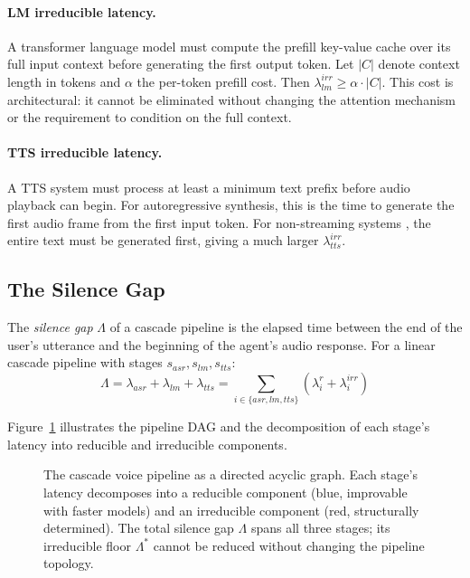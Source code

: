\paragraph{LM irreducible latency.}
A transformer language model \citep{vaswani2017attention} must compute the prefill
key-value cache over its full input context before generating the first output token.
Let $|C|$ denote context length in tokens and $\alpha$ the per-token prefill cost.
Then $\lambda_{lm}^{irr} \geq \alpha \cdot |C|$.
This cost is architectural: it cannot be eliminated without changing the attention
mechanism or the requirement to condition on the full context.

\paragraph{TTS irreducible latency.}
A TTS system must process at least a minimum text prefix
before audio playback can begin.
For autoregressive synthesis, this is the time to generate the first audio frame
from the first input token.
For non-streaming systems \citep{shen2018natural}, the entire text must be generated first,
giving a much larger $\lambda_{tts}^{irr}$.

\subsection{The Silence Gap}

\begin{definition}
\label{def:silence_gap}
The \emph{silence gap} $\Lambda$ of a cascade pipeline is the elapsed time between
the end of the user's utterance and the beginning of the agent's audio response.
For a linear cascade pipeline with stages $s_{asr}, s_{lm}, s_{tts}$:
\begin{equation}
  \Lambda = \lambda_{asr} + \lambda_{lm} + \lambda_{tts}
          = \sum_{i \in \{asr, lm, tts\}} (\lambda_i^r + \lambda_i^{irr})
\end{equation}
\end{definition}

Figure~\ref{fig:pipeline_dag} illustrates the pipeline DAG and the decomposition of
each stage's latency into reducible and irreducible components.

\begin{figure}[t]
  \centering
  \resizebox{\linewidth}{!}{%
  }
  \caption{The cascade voice pipeline as a directed acyclic graph.
           Each stage's latency decomposes into a reducible component
           (blue, improvable with faster models) and an irreducible component
           (red, structurally determined).
           The total silence gap $\Lambda$ spans all three stages;
           its irreducible floor $\Lambda^*$ cannot be reduced without
           changing the pipeline topology.}
  \label{fig:pipeline_dag}
\end{figure}

